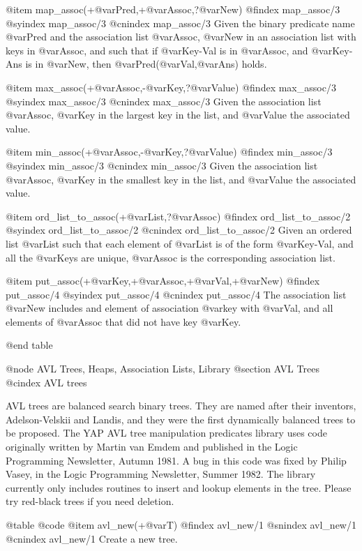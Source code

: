 {{{{{{{{@item map_assoc(+@var{Pred},+@var{Assoc},?@var{New})
@findex map_assoc/3
@syindex map_assoc/3
@cnindex map_assoc/3
Given the binary predicate name @var{Pred} and the association list
@var{Assoc}, @var{New} in an association list with keys in @var{Assoc},
and such that if @var{Key-Val} is in @var{Assoc}, and @var{Key-Ans} is in
@var{New}, then @var{Pred}(@var{Val},@var{Ans}) holds.

@item max_assoc(+@var{Assoc},-@var{Key},?@var{Value})
@findex max_assoc/3
@syindex max_assoc/3
@cnindex max_assoc/3
Given the association list
@var{Assoc}, @var{Key} in the largest key in the list, and @var{Value}
the associated value.

@item min_assoc(+@var{Assoc},-@var{Key},?@var{Value})
@findex min_assoc/3
@syindex min_assoc/3
@cnindex min_assoc/3
Given the association list
@var{Assoc}, @var{Key} in the smallest key in the list, and @var{Value}
the associated value.

@item ord_list_to_assoc(+@var{List},?@var{Assoc})
@findex ord_list_to_assoc/2
@syindex ord_list_to_assoc/2
@cnindex ord_list_to_assoc/2
Given an ordered list @var{List} such that each element of @var{List} is
of the form @var{Key-Val}, and all the @var{Keys} are unique, @var{Assoc} is
the corresponding association list.

@item put_assoc(+@var{Key},+@var{Assoc},+@var{Val},+@var{New})
@findex put_assoc/4
@syindex put_assoc/4
@cnindex put_assoc/4
The association list @var{New} includes and element of association
@var{key} with @var{Val}, and all elements of @var{Assoc} that did not
have key @var{Key}.

@end table

@node AVL Trees, Heaps, Association Lists, Library
@section AVL Trees
@cindex AVL trees

AVL trees are balanced search binary trees. They are named after their
inventors, Adelson-Velskii and Landis, and they were the first
dynamically balanced trees to be proposed. The YAP AVL tree manipulation
predicates library uses code originally written by Martin van Emdem and
published in the Logic Programming Newsletter, Autumn 1981.  A bug in
this code was fixed by Philip Vasey, in the Logic Programming
Newsletter, Summer 1982. The library currently only includes routines to
insert and lookup elements in the tree. Please try red-black trees if
you need deletion.

@table @code
@item avl_new(+@var{T})
@findex avl_new/1
@snindex avl_new/1
@cnindex avl_new/1
Create a new tree.

}}}}}}}}
